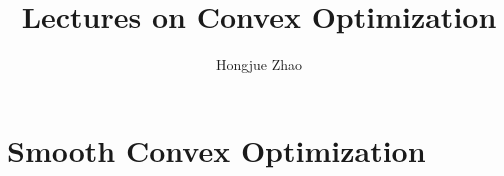 \documentclass[openany]{book}
\title{Lectures on Convex Optimization}
\author{Hongjue Zhao}
\date{}
\begin{document}
\tableofcontents

\mainmatter
\chapter{Smooth Convex Optimization}\label{chap:smooth-convex-opt}
{
    
}
% 
% 
% 
% 
\end{document}
